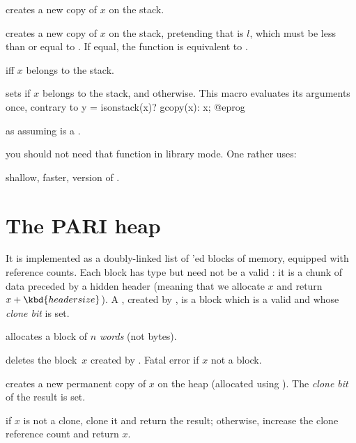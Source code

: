 
 creates a new copy of $x$ on the stack.

 creates a new copy of $x$
on the stack, pretending that  is $l$, which must be less than or
equal to . If equal, the function is equivalent to .

  iff $x$ belongs to the stack.

 sets  if
$x$ belongs to the stack, and  otherwise. This macro evaluates
its arguments once, contrary to
\bprog
  y = isonstack(x)? gcopy(x): x;
@eprog

 as  assuming 
is a .


 you should not need that function in library mode.
One rather uses:

 shallow, faster, version of .

\section{The PARI heap}

It is implemented as a doubly-linked list of 'ed blocks of
memory, equipped with reference counts. Each block has type  but need
not be a valid : it is a chunk of data preceded by a hidden header
(meaning that we allocate $x$ and return $x + \kbd{header size}$). A
, created by , is a block which is a valid 
and whose \emph{clone bit} is set.


 allocates a block of $n$ \emph{words} (not bytes).

 deletes the block~$x$ created by .
Fatal error if $x$ not a block.

 creates a new permanent copy of $x$ on the heap
(allocated using ). The \emph{clone bit} of the result is set.

 if $x$ is not a clone, clone it and return the
result; otherwise, increase the clone reference count and return $x$.

